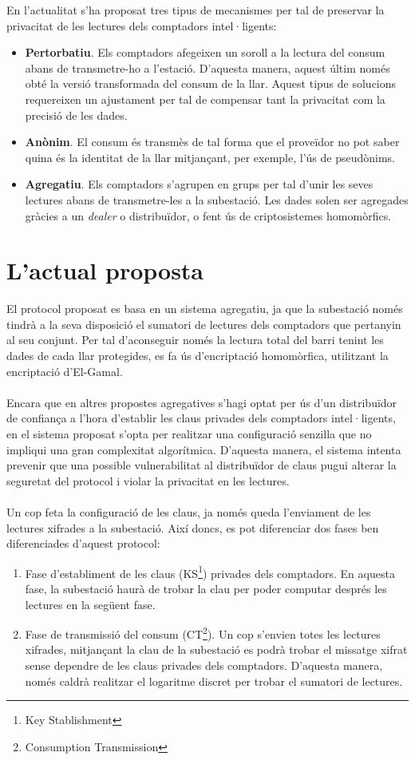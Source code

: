 \documentclass{article}
\begin{document}
En l'actualitat s'ha proposat tres tipus de mecanismes per tal de preservar la privacitat de les lectures dels comptadors intel·ligents:
\begin{itemize}
	\item \textbf{Pertorbatiu}. Els comptadors afegeixen un soroll a la lectura del consum abans de transmetre-ho a l'estació. D'aquesta manera, aquest últim només obté la versió transformada del consum de la llar. Aquest tipus de solucions requereixen un ajustament per tal de compensar tant la privacitat com la precisió de les dades.
	\item \textbf{Anònim}. El consum és transmès de tal forma que el proveïdor no pot saber quina és la identitat de la llar mitjançant, per exemple, l'ús de pseudònims.
	\item \textbf{Agregatiu}. Els comptadors s'agrupen en grups per tal d'unir les seves lectures abans de transmetre-les a la subestació. Les dades solen ser agregades gràcies a un \textit{dealer} o distribuïdor, o fent ús de criptosistemes homomòrfics.
\end{itemize}
\section{L'actual proposta}
El protocol proposat es basa en un sistema agregatiu, ja que la subestació només tindrà a la seva disposició el sumatori de lectures dels comptadors que pertanyin al seu conjunt. Per tal d'aconseguir només la lectura total del barri tenint les dades de cada llar protegides, es fa ús d'encriptació homomòrfica, utilitzant la encriptació d'El-Gamal.
\\\\
Encara que en altres propostes agregatives s'hagi optat per ús d'un distribuïdor de confiança a l'hora d'establir les claus privades dels comptadors intel·ligents, en el sistema proposat s'opta per realitzar una configuració senzilla que no impliqui una gran complexitat algorítmica. D'aquesta manera, el sistema intenta prevenir que una possible vulnerabilitat al distribuïdor de claus pugui alterar la seguretat del protocol i violar la privacitat en les lectures.
\\\\
Un cop feta la configuració de les claus, ja només queda l'enviament de les lectures xifrades a la subestació.
Així doncs, es pot diferenciar dos fases ben diferenciades d'aquest protocol:
\begin{enumerate}
\item Fase d'establiment de les claus (KS\footnote{Key Stablishment}) privades dels comptadors. En aquesta fase, la subestació haurà de trobar la clau per poder computar després les lectures en la següent fase.
\item Fase de transmissió del consum (CT\footnote{Consumption Transmission}). Un cop s'envien totes les lectures xifrades, mitjançant la clau de la subestació es podrà trobar el missatge xifrat sense dependre de les claus privades dels comptadors. D'aquesta manera, només caldrà realitzar el logaritme discret per trobar el sumatori de lectures.
\end{enumerate}
\end{document}

